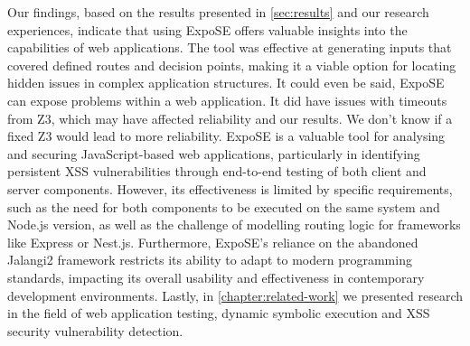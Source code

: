 Our findings, based on the results presented in \autoref{sec:results} and our research experiences, indicate that using ExpoSE offers valuable insights into the capabilities of web applications. 
The tool was effective at generating inputs that covered defined routes and decision points, making it a viable option for locating hidden issues in complex application structures. It could even be said, ExpoSE can expose problems within a web application. It did have issues with timeouts from Z3, which may have affected reliability and our results. We don't know if a fixed Z3 would lead to more reliability.
ExpoSE is a valuable tool for analysing and securing JavaScript-based web applications, particularly in identifying persistent XSS vulnerabilities through end-to-end testing of both client and server components. 
However, its effectiveness is limited by specific requirements, such as the need for both components to be executed on the same system and Node.js version, as well as the challenge of modelling routing logic for frameworks like Express or Nest.js. 
Furthermore, ExpoSE's reliance on the abandoned Jalangi2 framework restricts its ability to adapt to modern programming standards, impacting its overall usability and effectiveness in contemporary development environments.
Lastly, in \autoref{chapter:related-work} we presented research in the field of web application testing,  dynamic symbolic execution and XSS security vulnerability detection.




